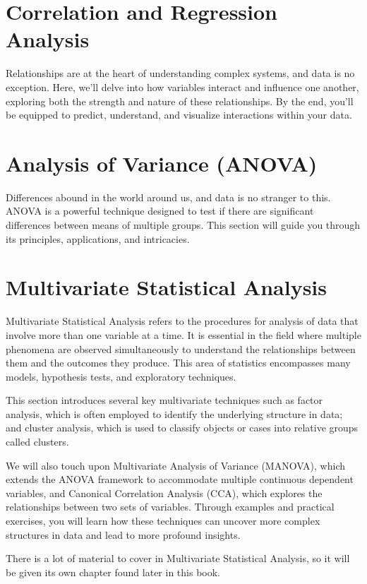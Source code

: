 \documentclass[a4paper,12pt]{book}
\newcounter{example}
\begin{document}

\section{Correlation and Regression Analysis}
Relationships are at the heart of understanding complex systems, and data is no exception. Here, we'll delve into how variables interact and influence one another, exploring both the strength and nature of these relationships. By the end, you'll be equipped to predict, understand, and visualize interactions within your data.

\section{Analysis of Variance (ANOVA)}
Differences abound in the world around us, and data is no stranger to this. ANOVA is a powerful technique designed to test if there are significant differences between means of multiple groups. This section will guide you through its principles, applications, and intricacies.

\section{Multivariate Statistical Analysis}
Multivariate Statistical Analysis refers to the procedures for analysis of data that involve more than one variable at a time. It is essential in the field where multiple phenomena are observed simultaneously to understand the relationships between them and the outcomes they produce. This area of statistics encompasses many models, hypothesis tests, and exploratory techniques.

This section introduces several key multivariate techniques such as factor analysis, which is often employed to identify the underlying structure in data; and cluster analysis, which is used to classify objects or cases into relative groups called clusters.

We will also touch upon Multivariate Analysis of Variance (MANOVA), which extends the ANOVA framework to accommodate multiple continuous dependent variables, and Canonical Correlation Analysis (CCA), which explores the relationships between two sets of variables. Through examples and practical exercises, you will learn how these techniques can uncover more complex structures in data and lead to more profound insights.

There is a lot of material to cover in Multivariate Statistical Analysis, so it will be given its own chapter found later in this book.
\end{document}
